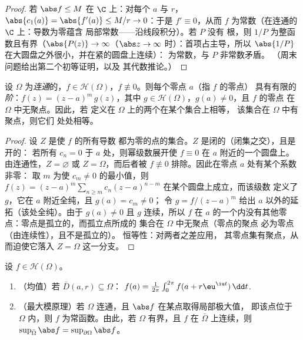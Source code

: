 \begin{proof}
若 $\abs f \leq M$ 在 $\C$ 上：对每个 $a$ 与 $r$，$\abs{c_1(a)}
= \abs{f'(a)} \leq M/r \to 0$：于是 $f' \equiv 0$，从而 $f$
为常数（在连通的 $\C$ 上：导数为零蕴含
局部常数——沿线段积分）。若 $P$ 没有
根，则 $1/P$ 为整函数且有界（$\abs{P(z)} \to
\infty$（$\abs z \to \infty$ 时）：首项占主导，所以
$\abs{1/P}$ 在大圆盘之外很小，并在紧的圆盘上连续）：
为常数，与 $P$ 非常数矛盾。
（周末问题给出第二个初等证明，以及
其代数推论。）
\end{proof}

\begin{theorem}
\label{thm:b3:holomorphic:identity}
设 $\Omega$ 为\emph{连通}的，$f \in \mathcal
H(\Omega)$，$f \not\equiv 0$。则每个零点 $a$（指 $f$ 的零点）
具有有限的\emph{阶}：$f(z) = (z - a)^m\,g(z)$，其中 $g \in
\mathcal H(\Omega)$，$g(a) \neq 0$，且 $f$ 的零点
在 $\Omega$ 中无聚点。因此，若
定义在 $\Omega$ 上的两个在某个集合上相等，
该集合在 $\Omega$ 中有聚点，则它们
处处相等。
\end{theorem}

\begin{proof}
设 $Z$ 是使 $f$ 的所有导数
都为零的点的集合。$Z$ 是闭的（闭集之交），且是开的：
若所有 $c_n = 0$ 于 $a$ 处，则幂级数展开使 $f
\equiv 0$ 在 $a$ 附近的一个圆盘上。由连通性，$Z =
\varnothing$ 或 $Z = \Omega$，而后者被 $f
\not\equiv 0$ 排除。因此在零点 $a$ 处有某个系数非零：
取 $m$ 为使 $c_m \neq 0$ 的最小值，则 $f(z) = (z -
a)^m\sum_{n\geq m}c_n(z-a)^{n-m}$ 在某个圆盘上成立，而该级数
定义了 $g$，它在 $a$ 附近全纯，且 $g(a) = c_m \neq 0$；
令 $g = f/(z-a)^m$ 给出 $a$ 以外的延拓（该处全纯）。由于
$g(a) \neq 0$ 且 $g$ 连续，所以 $f$ 在
$a$ 的一个内没有其他零点：零点是孤立的，而孤立点所成的
集合在 $\Omega$ 中无聚点（零点的聚点
必为零点（由连续性），且不是孤立的）。
恒等性：对两者之差应用，
其零点集有聚点，从而迫使它落入
$Z = \Omega$ 这一分支。
\end{proof}

\begin{theorem}[均值与最大模]
\label{thm:b3:holomorphic:maximum}
设 $f \in \mathcal H(\Omega)$。
\begin{enumerate}
  \item （均值）若 $\bar D(a, r) \subseteq \Omega$：
        $f(a) = \frac1{2\pi}\int_0^{2\pi}f(a +
        r\eu^{\iu t})\,\dd t$.
  \item （最大模原理）若 $\Omega$ 连通，且
        $\abs f$ 在某点取得局部极大值，
        即该点位于 $\Omega$ 内，则 $f$ 为常函数。由此，若
        $\Omega$ 有界，且 $f$ 在
        $\bar\Omega$ 上连续，则 $\sup_{\bar\Omega}\abs f =
        \sup_{\partial\Omega}\abs f$。
\end{enumerate}
\end{theorem}

